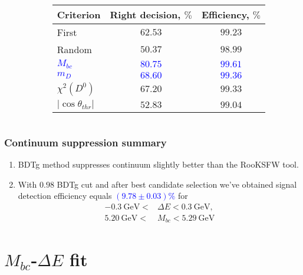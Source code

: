 \documentclass[10 pt,compress,mathserif]{beamer}
\begin{document}
\begin{frame}
\begin{small}
\begin{columns}
\begin{column}{0.4\textwidth}
  \end{column}
  \begin{column}{0.6\textwidth}
   \begin{table}[bt]
   \small
   \begin{tabular}{|l|c|c|} \hline
   {Criterion} & {Right decision}, $\%$ & {Efficiency}, $\%$ \\ \hline
   First              & $62.53$ & $99.23$ \\ \hline
   Random             & $50.37$ & $98.99$ \\ \hline
   \textcolor{blue}{$M_{bc}$} & \textcolor{blue}{$80.75$} & \textcolor{blue}{$99.61$} \\ \hline
   \textcolor{blue}{$m_D$}    & \textcolor{blue}{$68.60$} & \textcolor{blue}{$99.36$} \\ \hline
   $\chi^2(D^0)$      & $67.20$ & $99.33$ \\ \hline
   $\left|\cos\theta_{thr}\right|$ & $52.83$ & $99.04$ \\ \hline
   \end{tabular}
   \end{table}
  \end{column}
 \end{columns}
\end{small}
\end{frame}

\begin{frame}
 \frametitle{Continuum suppression summary}
 \begin{enumerate}
  \item BDTg method suppresses continuum slightly better than the RooKSFW tool.%
  \item With $0.98$ BDTg cut and after best candidate selection we've obtained signal detection efficiency equals \textcolor{blue}{$(9.78\pm0.03)\%$} %
  for
  \begin{equation*}
  \begin{split}
   -0.3\ \text{GeV} < &\Delta E < 0.3\ \text{GeV},\\
    5.20\ \text{GeV} < &M_{bc} < 5.29\ \text{GeV}
  \end{split}
  \end{equation*}
 \end{enumerate}
\end{frame}

\section{$M_{bc}$-$\Delta E$ fit}
\frame{\tableofcontents[current]}
\end{document}
